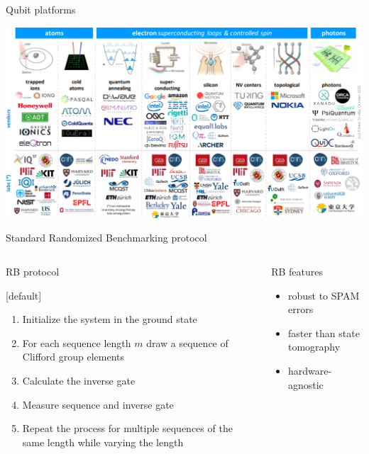 \documentclass[aspectratio=169,10pt]{beamer}
\begin{document}
\begin{frame}{Qubit platforms}
  \begin{center}
      \includegraphics[height=0.82\textheight]{figures/platforms.png}
  \end{center}
\end{frame}

\begin{frame}[fragile]{Standard Randomized Benchmarking protocol}
    \begin{columns}
      \begin{column}{0.5\textwidth}
        RB protocol
      {[default]
       \begin{enumerate}[leftmargin=*, label=\arabic*.]
         \item Initialize the system in the ground state
         \item For each sequence length $m$ draw a sequence of Clifford group elements
         \item Calculate the inverse gate 
         \item Measure sequence and inverse gate
         \item Repeat the process for multiple sequences of the same length while varying the length
       \end{enumerate}}
      \end{column}
      \begin{column}{0.5\textwidth}
        RB features
        \begin{itemize}
          \item robust to SPAM errors
          \hspace{10mm}
          \item faster than state tomography
          \hspace{10mm}
          \item hardware-agnostic 
        \end{itemize}
      \end{column}
    \end{columns}
\end{frame}
\end{document}
